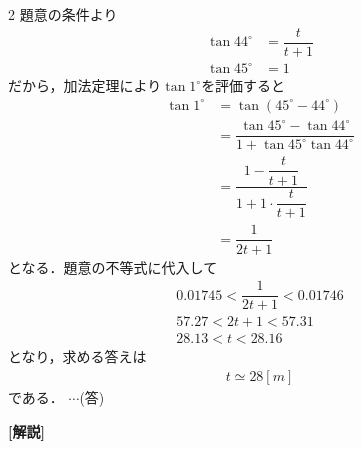 \documentclass[../../main.tex]{subfiles}
\begin{document}
\begin{multicols}{2}
  題意の条件より
  \begin{align}
    \tan 44^\circ & = \dfrac{t}{t+1} \\
    \tan 45^\circ & = 1
  \end{align}
  だから，加法定理により$\tan 1^{\circ}$を評価すると
  \begin{align}
    \tan 1^\circ & = \tan(45^\circ-44^\circ)                                               \\
    & = \dfrac{\tan 45^\circ - \tan 44^\circ}{1 + \tan 45^\circ \tan 44^\circ} \\
    & = \dfrac{1 - \dfrac{t}{t+1}}{1 + 1 \cdot \dfrac{t}{t+1}}                   \\
    & = \dfrac{1}{2t+1}
  \end{align}
  となる．題意の不等式に代入して
  \begin{align}
    0.01745 < \dfrac{1}{2t+1} < 0.01746 \\
    57.27 < 2t+1 < 57.31                 \\
    28.13 < t < 28.16
  \end{align}
  となり，求める答えは
  \begin{align}
    t \simeq 28 [m]
  \end{align}
  である．  $\cdots$(答)

  {\bf [解説]}

  \newpage
\end{multicols}
\end{document}
